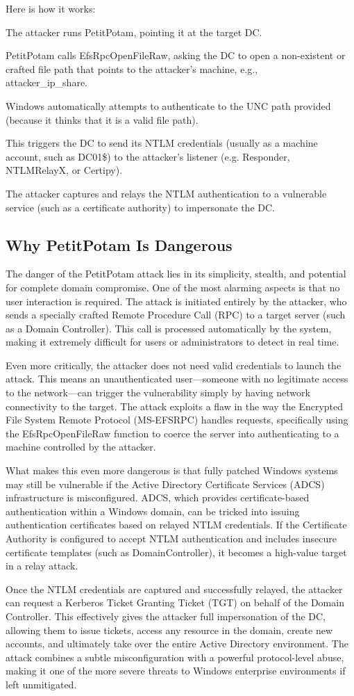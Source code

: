 Here is how it works:

The attacker runs PetitPotam, pointing it at the target DC.

PetitPotam calls EfsRpcOpenFileRaw, asking the DC to open a non-existent or crafted file path that points to the attacker’s machine, e.g., \\attacker\_ip\fake\_share\file.

Windows automatically attempts to authenticate to the UNC path provided (because it thinks that it is a valid file path).

This triggers the DC to send its NTLM credentials (usually as a machine account, such as DC01\$) to the attacker's listener (e.g. Responder, NTLMRelayX, or Certipy).

The attacker captures and relays the NTLM authentication to a vulnerable service (such as a certificate authority) to impersonate the DC.

\subsection{Why PetitPotam Is Dangerous}
The danger of the PetitPotam attack lies in its simplicity, stealth, and potential for complete domain compromise. One of the most alarming aspects is that no user interaction is required. The attack is initiated entirely by the attacker, who sends a specially crafted Remote Procedure Call (RPC) to a target server (such as a Domain Controller). This call is processed automatically by the system, making it extremely difficult for users or administrators to detect in real time.

Even more critically, the attacker does not need valid credentials to launch the attack. This means an unauthenticated user—someone with no legitimate access to the network—can trigger the vulnerability simply by having network connectivity to the target. The attack exploits a flaw in the way the Encrypted File System Remote Protocol (MS-EFSRPC) handles requests, specifically using the EfsRpcOpenFileRaw function to coerce the server into authenticating to a machine controlled by the attacker.

What makes this even more dangerous is that fully patched Windows systems may still be vulnerable if the Active Directory Certificate Services (ADCS) infrastructure is misconfigured. ADCS, which provides certificate-based authentication within a Windows domain, can be tricked into issuing authentication certificates based on relayed NTLM credentials. If the Certificate Authority is configured to accept NTLM authentication and includes insecure certificate templates (such as DomainController), it becomes a high-value target in a relay attack.

Once the NTLM credentials are captured and successfully relayed, the attacker can request a Kerberos Ticket Granting Ticket (TGT) on behalf of the Domain Controller. This effectively gives the attacker full impersonation of the DC, allowing them to issue tickets, access any resource in the domain, create new accounts, and ultimately take over the entire Active Directory environment. The attack combines a subtle misconfiguration with a powerful protocol-level abuse, making it one of the more severe threats to Windows enterprise environments if left unmitigated.